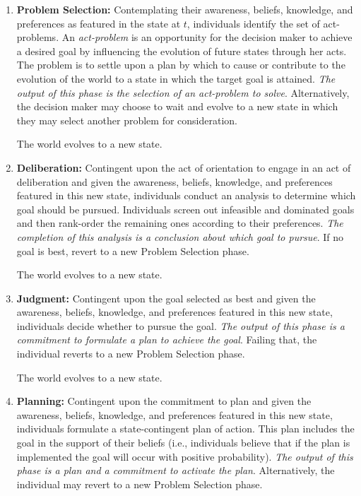 \documentclass[
11pt,
titlepage,
reqno,
]{article}%
\theoremstyle{definition}
\begin{document}
\begin{enumerate}
	\item \textbf{Problem Selection:} 
	Contemplating their awareness, beliefs, knowledge, and preferences as featured in the state at $t$, individuals identify the set of act-problems.
	An \textit{act-problem} is an opportunity for the decision maker to achieve a desired goal by influencing the evolution of future states through her acts. 
	The problem is to settle upon a plan by which to cause or contribute to the evolution of the world to a state in which the target goal is attained.
\textit{	The output of this phase is the selection of an act-problem to solve}.
	Alternatively, the decision maker may choose to wait and evolve to a new state in which they may select another problem for consideration.
	
	The world evolves to a new state.
	\item \textbf{Deliberation:} 
	Contingent upon the act of orientation to engage in an act of deliberation and given the awareness, beliefs, knowledge, and preferences featured in this new state, individuals conduct an analysis to determine which goal should be pursued. 
	Individuals screen out infeasible and dominated goals and then rank-order the remaining ones according to their preferences. 
	\textit{The completion of this analysis is a conclusion about which goal to pursue}. 
	If no goal is best, revert to a new Problem Selection phase.
	
	The world evolves to a new state.
	
	\item \textbf{Judgment:} 
	Contingent upon the goal selected as best and given the awareness, beliefs, knowledge, and preferences featured in this new state, individuals decide whether to pursue the goal. 
	\textit{The output of this phase is a commitment to formulate a plan to achieve the goal}. 
	Failing  that, the individual reverts to a new Problem Selection phase.
	
	The world evolves to a new state.
	
	\item \textbf{Planning:} 
	Contingent upon the commitment to plan and given the awareness, beliefs, knowledge, and preferences featured in this new state, individuals  formulate a state-contingent plan of action. 
	This plan includes the goal in the support of their beliefs (i.e., individuals believe that if the plan is implemented the goal will occur with positive probability). 
	\textit{The output of this phase is a plan and a commitment to activate the plan}.
	Alternatively, the individual may revert to a  new Problem Selection phase.
	

\end{enumerate}
\end{document}
